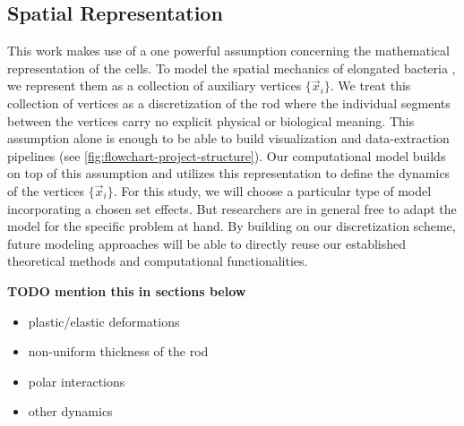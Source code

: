 \documentclass{article}
\begin{document}
\subsection{Spatial Representation}
\label{subsec:spatial-representation}
This work makes use of a one powerful assumption concerning the mathematical representation of the
cells.
To model the spatial mechanics of elongated bacteria \cite{Billaudeau2017}, we represent them as a
collection of auxiliary vertices $\{\vec{x}_i\}$.
We treat this collection of vertices as a discretization of the rod where the individual segments
between the vertices carry no explicit physical or biological meaning.
This assumption alone is enough to be able to build visualization and data-extraction pipelines (see
\ref{fig:flowchart-project-structure}).
Our computational model builds on top of this assumption and utilizes this representation to
define the dynamics of the vertices $\{\vec{x}_i\}$.
For this study, we will choose a particular type of model incorporating a chosen set effects.
But researchers are in general free to adapt the model for the specific problem at hand.
By building on our discretization scheme, future modeling approaches will be able to directly reuse
our established theoretical methods and computational functionalities.

\textbf{TODO mention this in sections below}
\begin{itemize}
    \item plastic/elastic deformations
    \item non-uniform thickness of the rod
    \item polar interactions \cite{Duvernoy2018}
    \item other dynamics
\end{itemize}

\end{document}
